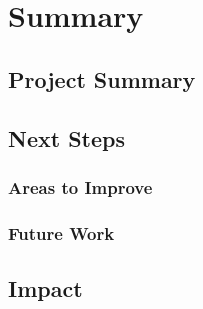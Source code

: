 \chapter{Summary}
\label{summary}




\section{Project Summary}

\section{Next Steps}
\subsection{Areas to Improve}

\subsection{Future Work}

\section{Impact}


